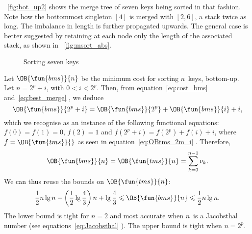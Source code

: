 \Fig~\vref{fig:bot_up2} shows the merge tree
of seven keys being sorted in that fashion. Note how the bottommost
singleton \([4]\) is merged with \([2,6]\), a stack twice as long. The
imbalance in length is further propagated upwards. The general case is
better suggested by retaining at each node only the length of the
associated stack, as shown in \fig~\vref{fig:msort_abs}.
\begin{figure}
\centering
{}
\qquad
{}
\caption{Sorting seven keys}
\end{figure}


Let \(\OB{\fun{bms}}{n}\) be the
minimum cost for sorting \(n\)~keys, bottom\hyp{}up. Let \(n=2^p+i\),
with \(0 < i < 2^p\). Then, from equation~\eqref{eq:cost_bms}
and~\eqref{eq:best_merge}
, we deduce
\begin{equation*}
\OB{\fun{bms}}{2^p+i} = \OB{\fun{bms}}{2^p} + \OB{\fun{bms}}{i} + i,
\end{equation*}
which we recognise as an instance of the following functional
equations: \(f(0)=f(1)=0\), \(f(2)=1\) and \(f(2^p+i) = f(2^p) + f(i)
+ i\), where \(f=\OB{\fun{tms}}{}\) as seen in
equation~\eqref{eq:OBtms_2m_i} . Therefore,
\begin{equation}
\OB{\fun{bms}}{n} = \OB{\fun{tms}}{n} = \sum_{k=0}^{n-1}{\nu_k}.
\label{eq:OBbms}
\end{equation}
We can thus reuse the bounds on \(\OB{\fun{tms}}{n}\):
\begin{equation}
\frac{1}{2}n\lg n - \left(\frac{1}{2}\lg\frac{4}{3}\right)n + \lg\frac{4}{3}
\leqslant \OB{\fun{bms}}{n} \leqslant
\frac{1}{2}n\lg n.
\index{bms@$\OB{\fun{bms}}{n}$}
\end{equation}
The lower bound is tight for \(n=2\) and most accurate when \(n\)~is a
Jacobsthal number (see
equations~\eqref{eq:Jacobsthal} ). The upper
bound is tight when \(n=2^p\).


